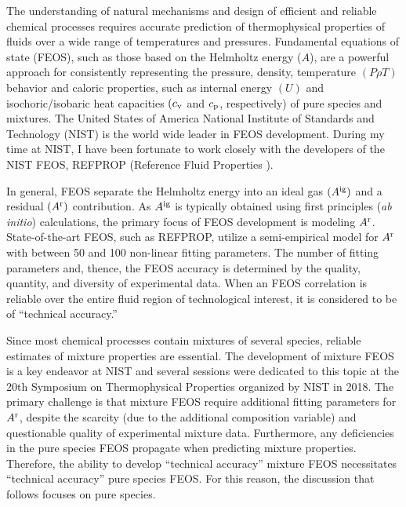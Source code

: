 \documentclass[12pt,a4paper]{article}
\begin{document}
The understanding of natural mechanisms and design of efficient and reliable chemical processes requires accurate prediction of thermophysical properties of fluids over a wide range of temperatures and pressures. Fundamental equations of state (FEOS), such as those based on the Helmholtz energy ($A$), are a powerful approach for consistently representing the pressure, density, temperature $(P\rho T)$ behavior and caloric properties, such as internal energy $(U)$ and isochoric/isobaric heat capacities $(c_{\rm v}$ and $c_{\rm p}$, respectively) of pure species and mixtures. The United States of America National Institute of Standards and Technology (NIST) is the world wide leader in FEOS development. During my time at NIST, I have been fortunate to work closely with the developers of the NIST FEOS, REFPROP (Reference Fluid Properties \cite{LEMMON-RP91}). 


In general, FEOS separate the Helmholtz energy into an ideal gas $(A^{\rm ig})$ and a residual $(A^{\rm r})$ contribution. As $A^{\rm ig}$ is typically obtained using first principles (\textit{ab initio}) calculations, the primary focus of FEOS development is modeling $A^{\rm r}$. State-of-the-art FEOS, such as REFPROP, utilize a semi-empirical model for $A^{\rm r}$ with between 50 and 100 non-linear fitting parameters. The number of fitting parameters and, thence, the FEOS accuracy is determined by the quality, quantity, and diversity of experimental data. When an FEOS correlation is reliable over the entire fluid region of technological interest, it is considered to be of ``technical accuracy.'' 

Since most chemical processes contain mixtures of several species, reliable estimates of mixture properties are essential. The development of mixture FEOS is a key endeavor at NIST and several sessions were dedicated to this topic at the 20th Symposium on Thermophysical Properties organized by NIST in 2018. The primary challenge is that mixture FEOS require additional fitting parameters for $A^{\rm r}$, despite the scarcity (due to the additional composition variable) and questionable quality of experimental mixture data. Furthermore, any deficiencies in the pure species FEOS propagate when predicting mixture properties. Therefore, the ability to develop ``technical accuracy'' mixture FEOS necessitates ``technical accuracy'' pure species FEOS. For this reason, the discussion that follows focuses on pure species. 
\end{document}
